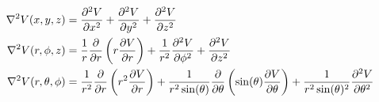 \begin{align*}
	\nabla^2 V(x,y,z) &= \frac{\p^2 V}{\p x^2} + \frac{\p^2 V}{\p y^2} + \frac{\p^2 V}{\p z^2} \\
%
	\nabla^2 V(r,\phi,z) &=%
		\frac{1}{r} \frac{\p}{\p r} \left( r \frac{\p V}{\p r} \right) +%
		\frac{1}{r^2} \frac{\p^2 V}{\p \phi^2} +%
		\frac{\p^2 V}{\p z^2} \\
%
	\nabla^2 V(r,\theta,\phi) &=%
		\frac{1}{r^2} \frac{\p}{\p r} \left( r^2 \frac{\p V}{\p r} \right) +%
		\frac{1}{r^2 \sin(\theta)} \frac{\p}{\p \theta} \left( \sin(\theta)\frac{\p V}{\p \theta} \right) +%
		\frac{1}{r^2 \sin(\theta)^2} \frac{\p^2 V}{\p \theta^2}
\end{align*}
